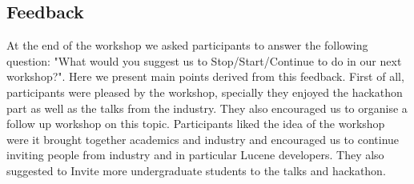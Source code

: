 \subsection{Feedback}

At the end of the workshop we asked participants to answer the following question: "What would you suggest us to Stop/Start/Continue to do in our next workshop?". 
Here we present main points derived from this feedback. 
First of all, participants were pleased by the workshop, specially they enjoyed the hackathon part as well as the talks from the industry. 
They also encouraged us to organise a follow up workshop on this topic.   
Participants liked the idea of the workshop were it brought together academics and industry and encouraged us to continue inviting people from industry and in particular Lucene developers.
They also suggested to Invite more undergraduate students to the talks and hackathon.  

